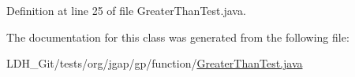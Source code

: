 Definition at line 25 of file Greater\-Than\-Test.\-java.



The documentation for this class was generated from the following file\-:\begin{DoxyCompactItemize}
\item 
L\-D\-H\-\_\-\-Git/tests/org/jgap/gp/function/\hyperlink{_greater_than_test_8java}{Greater\-Than\-Test.\-java}\end{DoxyCompactItemize}
